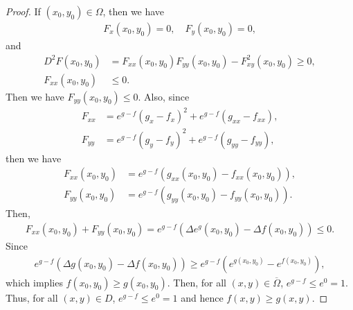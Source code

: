 \documentclass[11pt]{article}
\theoremstyle{definition}
\numberwithin{equation}{subsection}
\begin{document}
\begin{proof}
If $(x_0,y_0) \in \Omega$, then we have
\begin{align*}
    F_x(x_0, y_0) = 0, \quad F_y(x_0, y_0)  = 0,
\end{align*}
and
\begin{align*}
    D^2 F(x_0, y_0) & = F_{xx}(x_0, y_0) F_{yy}(x_0, y_0) - F_{xy}^2(x_0, y_0) \geq 0, \\
    F_{xx}(x_0, y_0) & \leq 0.
\end{align*}
Then we have $F_{yy}(x_0, y_0) \leq 0$. Also, since
\begin{align*}
    F_{xx} & = e^{g-f}(g_x - f_x)^2 + e^{g-f}(g_{xx} - f_{xx}), \\
    F_{yy} & = e^{g-f}(g_y - f_y)^2 + e^{g-f}(g_{yy} - f_{yy}),
\end{align*}
then we have
\begin{align*}
    F_{xx}(x_0, y_0) & = e^{g-f}(g_{xx}(x_0, y_0) - f_{xx}(x_0, y_0)), \\
    F_{yy}(x_0, y_0) & = e^{g-f}(g_{yy}(x_0, y_0) - f_{yy}(x_0, y_0)).
\end{align*}
Then,
\begin{align*}
    F_{xx}(x_0, y_0) + F_{yy}(x_0, y_0) = e^{g-f}(\Delta e^g(x_0, y_0) - \Delta f(x_0, y_0)) \leq 0.
\end{align*}
Since
\begin{align*}
    e^{g-f}(\Delta g(x_0, y_0) - \Delta f(x_0, y_0)) \geq e^{g-f}(e^{g(x_0, y_0)} - e^{f(x_0, y_0)}),
\end{align*}
which implies $f(x_0, y_0) \geq g(x_0, y_0)$. Then, for all $(x, y) \in \overline{\Omega}$, $e^{g-f} \leq e^0 = 1$. Thus, for all $(x, y) \in D$, $e^{g-f} \leq e^0 = 1$ and hence $f(x, y) \geq g(x, y)$.
\end{proof}

\medskip
\end{document}
